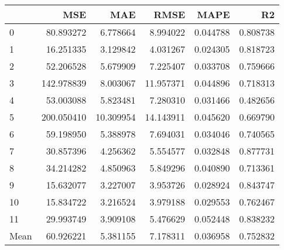 \begin{tabular}{lrrrrr}
\toprule
 & MSE & MAE & RMSE & MAPE & R2 \\
\midrule
0 & 80.893272 & 6.778664 & 8.994022 & 0.044788 & 0.808738 \\
1 & 16.251335 & 3.129842 & 4.031267 & 0.024305 & 0.818723 \\
2 & 52.206528 & 5.679909 & 7.225407 & 0.033708 & 0.759666 \\
3 & 142.978839 & 8.003067 & 11.957371 & 0.044896 & 0.718313 \\
4 & 53.003088 & 5.823481 & 7.280310 & 0.031466 & 0.482656 \\
5 & 200.050410 & 10.309954 & 14.143911 & 0.045620 & 0.669790 \\
6 & 59.198950 & 5.388978 & 7.694031 & 0.034046 & 0.740565 \\
7 & 30.857396 & 4.256362 & 5.554577 & 0.032848 & 0.877731 \\
8 & 34.214282 & 4.850963 & 5.849296 & 0.040890 & 0.713361 \\
9 & 15.632077 & 3.227007 & 3.953726 & 0.028924 & 0.843747 \\
10 & 15.834722 & 3.216524 & 3.979188 & 0.029553 & 0.762467 \\
11 & 29.993749 & 3.909108 & 5.476629 & 0.052448 & 0.838232 \\
Mean & 60.926221 & 5.381155 & 7.178311 & 0.036958 & 0.752832 \\
\bottomrule
\end{tabular}
